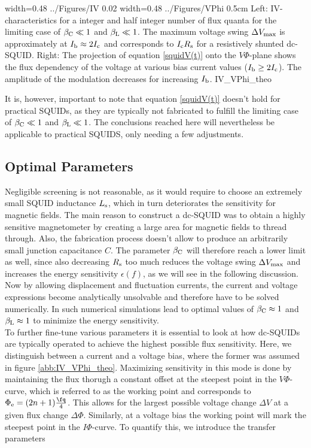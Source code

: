 {width=0.48\textwidth}
{../Figures/IV}
{0.02\textwidth} %
{width=0.48\textwidth}
{../Figures/VPhi}
{0.5cm} %
{Left: IV-characteristics for a integer and half integer number of flux quanta for the limiting case of $\beta_{\rm C}\ll 1$ and $\beta_{\rm L}\ll 1$. The maximum voltage swing $\Delta V_{\rm max}$ is approximately at $I_{\rm b}\approx 2I_{\rm c}$ and corresponds to $I_{\rm c}R_{\rm s}$ for a resistively shunted dc-SQUID. Right: The projection of equation \ref{squidV(t)} onto the $V\Phi$-plane shows the flux dependency of the voltage at various bias current values ($I_{\rm b}\geq 2I_{\rm c}$). The amplitude of the modulation decreases for increasing $I_{\rm b}$.}
{IV_VPhi_theo}

It is, however, important to note that equation \ref{squidV(t)} doesn't hold for practical SQUIDs, as they are typically not fabricated to fulfill the limiting case of $\beta_{\rm C}\ll 1$ and $\beta_{\rm L}\ll 1$. The conclusions reached here will nevertheless be applicable to practical SQUIDS, only needing a few adjustments. 

\subsection{Optimal Parameters}\label{subsec_optparam_theo}

Negligible screening is not reasonable, as it would require to choose an extremely small SQUID inductance $L_{\rm s}$, which in turn deteriorates the sensitivity for magnetic fields. The main reason to construct a dc-SQUID was to obtain a highly sensitive magnetometer by creating a large area for magnetic fields to thread through. Also, the fabrication process doesn't allow to produce an arbitrarily small junction capacitance $C$. The parameter $\beta_{\rm C}$ will therefore reach a lower limit as well, since also decreasing $R_{\rm s}$ too much reduces the voltage swing $\Delta V_{\rm max}$ and increases the energy sensitivity $\epsilon(f)$, as we will see in the following discussion. Now by allowing displacement and fluctuation currents, the current and voltage expressions become analytically unsolvable and therefore have to be solved numerically. In \cite{Tesche1977} such numerical simulations lead to optimal values of $\beta_{\rm C}\approx 1$ and $\beta_{\rm L}\approx 1$ to minimize the energy sensitivity. \\

To further fine-tune various parameters it is essential to look at how dc-SQUIDs are typically operated to achieve the highest possible flux sensitivity. Here, we distinguish between a current and a voltage bias, where the former was assumed in figure \ref{abb:IV_VPhi_theo}. Maximizing sensitivity in this mode is done by maintaining the flux thorugh a constant offset at the steepest point in the $V\Phi$-curve, which is referred to as the working point and corresponds to $\Phi_{\rm e}=(2n+1)\frac{\unit{\fq}}{4}$. This allows for the largest possible voltage change $\Delta V$ at a given flux change $\Delta \Phi$. Similarly, at a voltage bias the working point will mark the steepest point in the $I\Phi$-curve. To quantify this, we introduce the transfer parameters 

